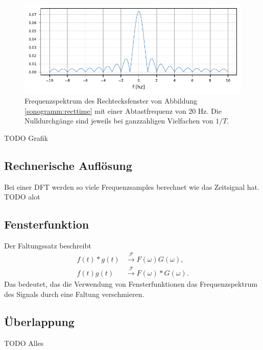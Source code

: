 \begin{figure}
    \centering
    \includegraphics{papers/sonogramm/images/rect_freq.pdf}
    \caption{Frequenzspektrum des Rechtecksfenster von Abbildung \ref{sonogramm:recttime}
    mit einer Abtastfrequenz von 20 Hz. Die Nulldurchgänge sind jeweils bei ganzzahligen Vielfachen
    von $1/T$.
    \label{sonogramm:rectfreq}
    }
\end{figure}
TODO Grafik

\subsection{Rechnerische Auflösung}
Bei einer DFT werden so viele Frequenzsamples berechnet wie das
Zeitsignal hat. 
TODO alot

\subsection{Fensterfunktion}
Der Faltungssatz beschreibt 
\begin{align}
    f(t) * g(t)& \xrightarrow{\mathscr{F}} F(\omega)G(\omega),\\
    f(t) g(t)&\xrightarrow{\mathscr{F}}F(\omega) * G(\omega).
\end{align}
Das bedeutet, das die Verwendung von Fensterfunktionen das Frequenzspektrum
des Signals durch eine Faltung verschmieren.
\subsection{Überlappung}
TODO Alles



